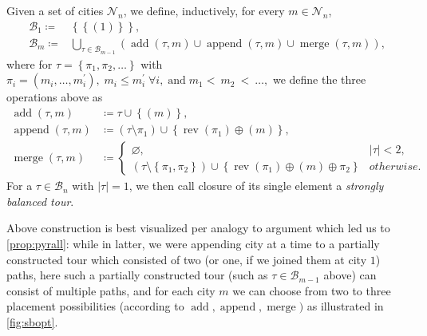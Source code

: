 \documentclass[index=totoc,bibliography=totoc]{scrartcl}
\numberwithin{equation}{section}
\numberwithin{figure}{section}
\numberwithin{table}{section}
\let\defstyle\itshape
\begin{document}
\begin{define}
\label{def:sbtour}
  Given a set of cities $\mathcal{N}_n$, we define, inductively,
  for every $m \in \mathcal{N}_n$,
  \begin{align*}
    \mathcal{B}_1 \coloneqq & \left\{ \left\{\left(1\right)\right\} \right\},
    \\
    \mathcal{B}_m \coloneqq & \bigcup_{\tau \in \mathcal{B}_{m-1}}
      \left(
      \operatorname{add}\left(\tau,m\right)
      \cup
      \operatorname{append}\left(\tau,m\right)
      \cup
      \operatorname{merge}\left(\tau,m\right)
      \right),
  \end{align*}
  where for $ \tau = \left\{ \pi_1, \pi_2, \ldots \right\} $ with
  $
    \pi_i = \left(m_i,\ldots,m_i^\prime\right), \;
    m_i \leq m_i^\prime \; \forall i, \;
    \text{and} \; m_1 <~ m_2~ <~\ldots,
  $
  we define the three operations above as
  \begin{align*}
    \operatorname{add}\left(\tau,m\right)
    & \coloneqq \tau \cup \left\{ \left(m\right) \right\},\\
    \operatorname{append}\left(\tau,m\right)
    & \coloneqq \left( \tau \setminus \pi_1 \right) \cup \left\{ \operatorname{rev}\left(\pi_1\right) \oplus \left(m\right) \right\},\\
    \operatorname{merge}\left(\tau,m\right)
    & \coloneqq
    \begin{cases}
      \varnothing, & \lvert\tau\rvert < 2,
      \\
      \left( \tau \setminus \left\{\pi_1,\pi_2\right\} \right)
      \cup \left\{ \operatorname{rev}\left(\pi_1\right) \oplus \left(m\right) \oplus \pi_2 \right\}
      & otherwise.
    \end{cases}
  \end{align*}
  For a $\tau \in \mathcal{B}_n$ with $\left|\tau\right| = 1$,
  we then call closure of its single element a {\defstyle strongly balanced tour}.
\end{define}

Above construction is best visualized per analogy to argument which led us
to \cref{prop:pyrall}: while in latter, we were appending city at a time to
a partially constructed tour which consisted of two (or one, if we joined
them at city $1$) paths, here such a partially constructed tour (such as
$\tau \in \mathcal{B}_{m-1}$ above) can consist of multiple paths, and for each city
$m$ we can choose from two to three placement possibilities (according to
$\operatorname{add}, \operatorname{append}, \operatorname{merge})$ as
illustrated in \cref{fig:sbopt}.
\end{document}
